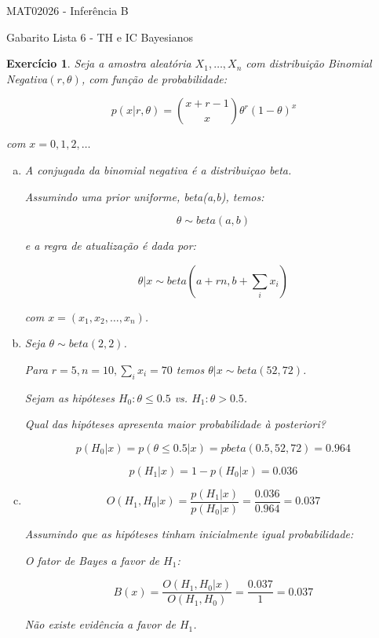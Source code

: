 \documentclass[letter,11pt]{article}
\newtheorem{exer}{Exercício}
\begin{document}
\begin{center}{ \Large MAT02026 - Inferência B }\end{center}

\begin{center}
{\large  \sc Gabarito Lista 6 - TH e IC Bayesianos}
\end{center}
\vspace{5mm}

\begin{exer} \rm
Seja a amostra aleatória $X_1, \ldots, X_n$ com distribuição Binomial Negativa$(r,\theta)$, com função de probabilidade:

$$p(x|r,\theta) = \binom {x+r-1} x \theta^r (1-\theta)^x$$

com $x = 0,1,2,\ldots$

\begin{enumerate}[a)]
\item A conjugada da binomial negativa é a distribuiçao beta.

Assumindo uma prior uniforme, beta(a,b), temos:

$$\theta \sim beta(a,b)$$

e a regra de atualização é dada por:

$$\theta | x \sim beta(a + rn, b + \sum_i x_i)$$

com $x = (x_1, x_2, \ldots, x_n)$.

\item Seja $\theta \sim beta(2,2)$.

Para $r=5, n=10, \sum_i x_i = 70$ temos $\theta|x \sim beta(52,72)$.

Sejam as hipóteses $H_0:\theta \leq 0.5$ vs. $H_1:\theta \gt 0.5$. 

Qual das hipóteses apresenta maior probabilidade à posteriori?

$$p(H_0|x) = p(\theta \leq 0.5|x) = pbeta(0.5,52,72) = 0.964$$

$$p(H_1|x) = 1 - p(H_0|x) = 0.036$$


\item $$O(H_1,H_0|x) = \frac{p(H_1|x)}{p(H_0|x)} = \frac{0.036}{0.964} = 0.037$$

Assumindo que as hipóteses tinham inicialmente igual probabilidade:

O fator de Bayes a favor de $H_1$:

$$B(x) = \frac{O(H_1,H_0|x)}{O(H_1,H_0)} = \frac{0.037}{1} = 0.037$$

Não existe evidência a favor de $H_1$.

\end{enumerate}
\end{exer}
\end{document}
